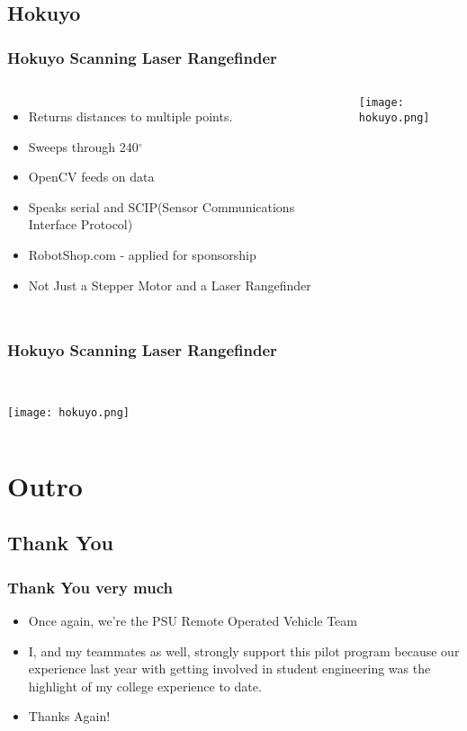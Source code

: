 \documentclass{beamer}
\begin{document}
\subsection{Hokuyo}
\frame
{
    \frametitle{Hokuyo Scanning Laser Rangefinder}
        \begin{columns}[c]

    \begin{itemize}
        \item Returns distances to multiple points.
        \item Sweeps through 240$^\circ$ 
        \item OpenCV feeds on data
        \item Speaks serial and SCIP(Sensor Communications Interface Protocol)
        \item RobotShop.com - applied for sponsorship
        \item Not Just a Stepper Motor and a Laser Rangefinder
    \end{itemize}
        \texttt{[image: hokuyo.png]}
    \end{columns}
        

}

\frame
{
    \frametitle{Hokuyo Scanning Laser Rangefinder}
        \begin{columns}[c]

        \\
        \texttt{[image: hokuyo.png]}
    \end{columns}
        

}
\section{Outro}
\subsection{Thank You}
\frame
{
    \frametitle{Thank You very much}

    \begin{itemize}
        \item Once again, we're the PSU Remote Operated Vehicle Team
        \item I, and my teammates as well, strongly support this pilot program because our experience last year with getting involved in student engineering was the highlight of my college experience to date. 
        \item Thanks Again!
    \end{itemize}
}
\end{document}

